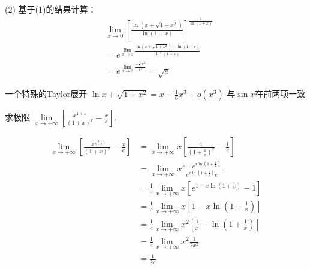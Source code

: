 \documentclass[12pt, a4paper, oneside, UTF8]{ctexbook}
\begin{document}
\begin{solution}
(2) 基于(1)的结果计算：
\begin{align*}
&\lim_{x \to 0}\left[\frac{\ln(x+\sqrt{1+x^2})}{\ln(1+x)}\right]^{\frac{1}{\ln(1+x)}} \\
&= e^{\lim\limits_{x \to 0}\frac{\ln(x+\sqrt{1+x^2})-\ln(1+x)}{\ln^2(1+x)}} \\
&= e^{\lim\limits_{x \to 0}\frac{-\frac{1}{2}x^2}{x^2}} = \sqrt{e}
\end{align*}
\end{solution}

\begin{remark}
    一个特殊的Taylor展开
    $\ln{x+\sqrt{1+x^2}}=x -\frac{1}{6}x^3+o(x^3)$ 与$\sin{x}$在前两项一致
\end{remark}
\begin{example}
求极限 $\lim\limits_{x\to+\infty}\left[\frac{x^{1+x}}{(1+x)^{x}}-\frac{x}{e}\right]$.
\end{example}
\begin{solution}
\begin{align*}
\lim _{x\rightarrow+\infty}\left[\frac{x^{\frac{1}{1+x}}}{(1+x)^{x}}-\frac{x}{e}\right] 
&= \lim _{x\rightarrow+\infty} x\left[\frac{1}{\left(1+\frac{1}{x}\right)^{x}}-\frac{1}{e}\right] \\
&= \lim _{x\rightarrow+\infty} x\frac{e-e^{x\ln\left(1+\frac{1}{x}\right)}}{e^{x\ln\left(1+\frac{1}{x}\right)} e} \\
&= \frac{1}{e}\lim _{x\rightarrow+\infty} x\left[e^{1-x\ln\left(1+\frac{1}{x}\right)}-1\right] \\
&= \frac{1}{e}\lim _{x\rightarrow+\infty} x\left[1-x\ln\left(1+\frac{1}{x}\right)\right] \\
&= \frac{1}{e}\lim _{x\rightarrow+\infty} x^{2}\left[\frac{1}{x}-\ln\left(1+\frac{1}{x}\right)\right] \\
&= \frac{1}{e}\lim _{x\rightarrow+\infty} x^{2}\frac{1}{2 x^{2}} \\
&= \frac{1}{2 e}
\end{align*}
\end{solution}
\end{document}
